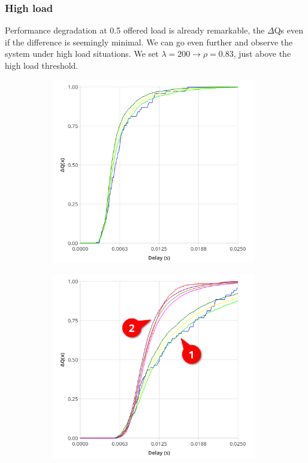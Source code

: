     
\subsubsection{High load}
    Performance degradation at 0.5 offered load is already remarkable, the $\Delta$Qs even if the difference is seemingly minimal. We can go even further and observe the system under high load situations. We set $\lambda = 200 \rightarrow \rho = 0.83$, just above the high load threshold.
    
       \begin{figure}[H]
            \centering
            \begin{subfigure}{.5\textwidth}
                \centering
                \includegraphics[width=0.98\textwidth]{img/overload_2/250_worker.png}
                \label{fig:high_load_1}
            \end{subfigure}%
            \begin{subfigure}{.5\textwidth}
                \centering
                \includegraphics[width =0.98\textwidth]{img/overload_2/250_probe2.png}

\end{subfigure}
\end{figure}
